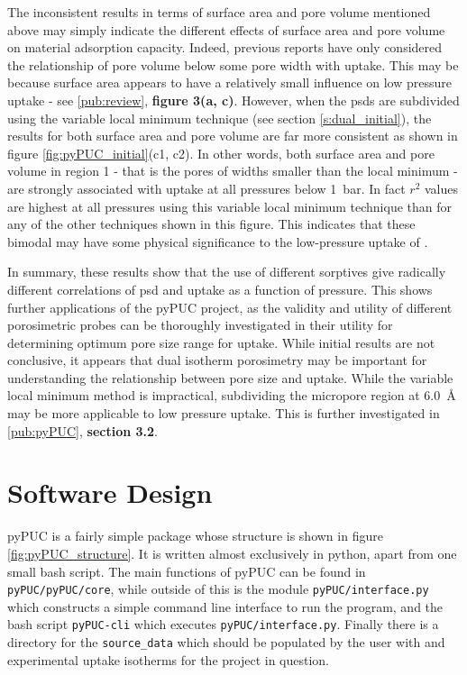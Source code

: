 The inconsistent results in terms of surface area and pore volume mentioned above may simply indicate the different effects of surface area and pore volume on material \gls{adsorption} capacity. Indeed, previous reports have only considered the relationship of pore volume below some pore width with  uptake.\citep{Presser2011Effect, Sevilla2013Assessment, Adeniran2016Is, Wickramaratne2013Importance} This may be because surface area appears to have a relatively small influence on low pressure  uptake\citep{Sevilla2021More, Ludwinowicz2015Effect, Singh2019CO2, GrauMarin2020Evaluation} - see \ref{pub:review}, \textbf{figure 3(a, c)}. However, when the \glspl{psd} are subdivided using the variable local minimum technique (see section \ref{s:dual_initial}), the results for both surface area and pore volume are far more consistent as shown in figure \ref{fig:pyPUC_initial}(c1, c2). In other words, both surface area and pore volume in region 1 - that is the pores of widths smaller than the local minimum - are strongly associated with  uptake at all pressures below \qty{1}{\bar}. In fact $r^2$ values are highest at all pressures using this variable local minimum technique than for any of the other techniques shown in this figure. This indicates that these bimodal  may have some physical significance to the low-pressure uptake of .

In summary, these results show that the use of different sorptives give radically different correlations of \gls{psd} and  uptake as a function of pressure. This shows further applications of the pyPUC project, as the validity and utility of different porosimetric probes can be thoroughly investigated in their utility for determining optimum pore size range for  uptake. While initial results are not conclusive, it appears that dual isotherm porosimetry may be important for understanding the relationship between pore size and  uptake. While the variable local minimum method is impractical, subdividing the micropore region at \qty{6.0}{\angstrom} may be more applicable to low pressure  uptake. This is further investigated in \ref{pub:pyPUC}, \textbf{section 3.2}.

\section{Software Design}
\label{s:pypuc_design}
pyPUC is a fairly simple package whose structure is shown in figure \ref{fig:pyPUC_structure}. It is written almost exclusively in python,\citep{python1995} apart from one small bash script.\citep{bash2007} The main functions of pyPUC can be found in \verb|pyPUC/pyPUC/core|, while outside of this is the module \verb|pyPUC/interface.py| which constructs a simple command line interface to run the program, and the bash script \verb|pyPUC-cli| which executes \verb|pyPUC/interface.py|. Finally there is a directory for the \verb|source_data| which should be populated by the user with  and experimental uptake isotherms for the project in question.

